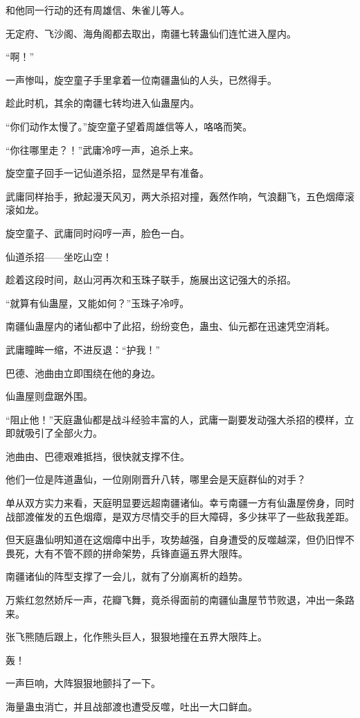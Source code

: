 \begin{this_body}
和他同一行动的还有周雄信、朱雀儿等人。

无定府、飞沙阁、海角阁都去取出，南疆七转蛊仙们连忙进入屋内。

“啊！”

一声惨叫，旋空童子手里拿着一位南疆蛊仙的人头，已然得手。

趁此时机，其余的南疆七转均进入仙蛊屋内。

“你们动作太慢了。”旋空童子望着周雄信等人，咯咯而笑。

“你往哪里走？！”武庸冷哼一声，追杀上来。

旋空童子回手一记仙道杀招，显然是早有准备。

武庸同样抬手，掀起漫天风刃，两大杀招对撞，轰然作响，气浪翻飞，五色烟瘴滚滚如龙。

旋空童子、武庸同时闷哼一声，脸色一白。

仙道杀招——坐吃山空！

趁着这段时间，赵山河再次和玉珠子联手，施展出这记强大的杀招。

“就算有仙蛊屋，又能如何？”玉珠子冷哼。

南疆仙蛊屋内的诸仙都中了此招，纷纷变色，蛊虫、仙元都在迅速凭空消耗。

武庸瞳眸一缩，不进反退：“护我！”

巴德、池曲由立即围绕在他的身边。

仙蛊屋则盘踞外围。

“阻止他！”天庭蛊仙都是战斗经验丰富的人，武庸一副要发动强大杀招的模样，立即就吸引了全部火力。

池曲由、巴德艰难抵挡，很快就支撑不住。

他们一位是阵道蛊仙，一位刚刚晋升八转，哪里会是天庭群仙的对手？

单从双方实力来看，天庭明显要远超南疆诸仙。幸亏南疆一方有仙蛊屋傍身，同时战部渡催发的五色烟瘴，是双方尽情交手的巨大障碍，多少抹平了一些敌我差距。

但天庭蛊仙明知道在这烟瘴中出手，攻势越强，自身遭受的反噬越深，但仍旧悍不畏死，大有不管不顾的拼命架势，兵锋直逼五界大限阵。

南疆诸仙的阵型支撑了一会儿，就有了分崩离析的趋势。

万紫红忽然娇斥一声，花瓣飞舞，竟杀得面前的南疆仙蛊屋节节败退，冲出一条路来。

张飞熊随后跟上，化作熊头巨人，狠狠地撞在五界大限阵上。

轰！

一声巨响，大阵狠狠地颤抖了一下。

海量蛊虫消亡，并且战部渡也遭受反噬，吐出一大口鲜血。


\end{this_body}
